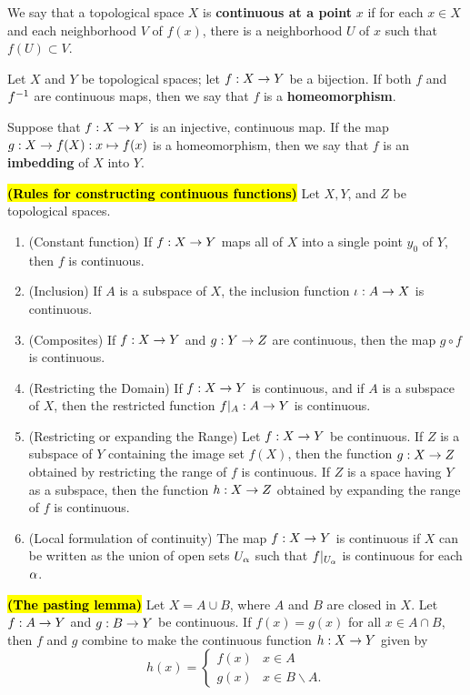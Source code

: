 \dfn We say that a topological space $X$ is \textbf{continuous at a point} $x$ if for each $x\in X$ and each neighborhood $V$ of $f(x)$, there is a neighborhood $U$ of $x$ such that $f(U)\subset V$.

\dfn Let $X$ and $Y$ be topological spaces; let $f:X\rightarrow Y$ be a bijection. If both $f$ and $f^{-1}$ are continuous maps, then we say that $f$ is a \textbf{homeomorphism}.

\dfn Suppose that $f:X\rightarrow Y$ is an injective, continuous map. If the map $g:X\rightarrow f(X):x\mapsto f(x)$ is a homeomorphism, then we say that $f$ is an \textbf{imbedding} of $X$ into $Y$.

\vs

\begin{thm}
\textbf{\hl{(Rules for constructing continuous functions)}} Let $X,Y$, and $Z$ be topological spaces.
\begin{enumerate}
    \item (Constant function) If $f:X\rightarrow Y$ maps all of $X$ into a single point $y_0$ of $Y$, then $f$ is continuous.
    \item (Inclusion) If $A$ is a subspace of $X$, the inclusion function $\iota:A\rightarrow X$ is continuous.
    \item (Composites) If $f:X\rightarrow Y$ and $g:Y\rightarrow Z$ are continuous, then the map $g\circ f$ is continuous.
    \item (Restricting the Domain) If $f:X\rightarrow Y$ is continuous, and if $A$ is a subspace of $X$, then the restricted function $f|_A:A\rightarrow Y$ is continuous.
    \item (Restricting or expanding the Range) Let $f:X\rightarrow Y$ be continuous. If $Z$ is a subspace of $Y$ containing the image set $f(X)$, then the function $g:X\rightarrow Z$ obtained by restricting the range of $f$ is continuous. If $Z$ is a space having $Y$ as a subspace, then the function $h:X\rightarrow Z$ obtained by expanding the range of $f$ is continuous.
    \item (Local formulation of continuity) The map $f:X\rightarrow Y$ is continuous if $X$ can be written as the union of open sets $U_\alpha$ such that $f|_{U_\alpha}$ is continuous for each $\alpha$.
\end{enumerate}
\end{thm}

\vs

\begin{thm}
\textbf{\hl{(The pasting lemma)}} Let $X = A\cup B$, where $A$ and $B$ are closed in $X$. Let $f:A\rightarrow Y$ and $g:B\rightarrow Y$ be continuous. If $f(x) = g(x)$ for all $x\in A\cap B$, then $f$ and $g$ combine to make the continuous function $h:X\rightarrow Y$ given by
\[h(x) = \begin{cases}
f(x) & x\in A\\
g(x) & x\in B\backslash A. \end{cases}\]
\end{thm}

